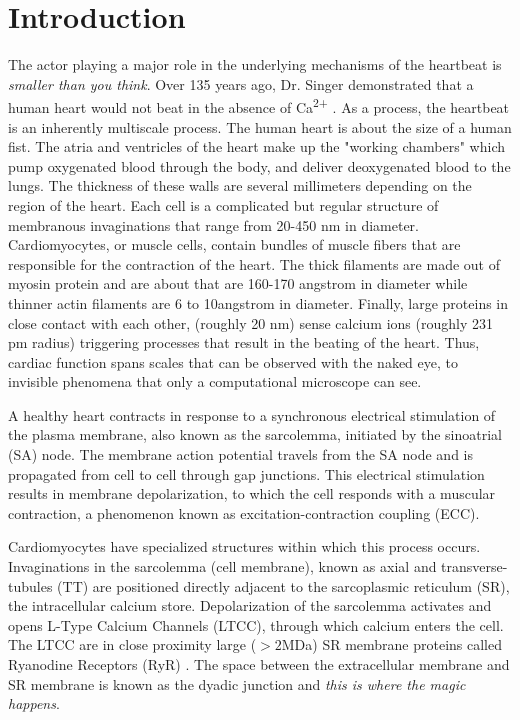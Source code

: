 \documentclass[12pt]{ucsddissertation}
\begin{document}
\section{Introduction}
The actor playing a major role in the underlying mechanisms of the heartbeat is \textit{smaller than you think}. Over 135 years ago, Dr. Singer demonstrated that a human heart would not beat in the absence of Ca\textsuperscript{2+} \cite{Ringer1883}. As a process, the heartbeat is an inherently multiscale process. The human heart is about the size of a human fist. The atria and ventricles of the heart make up the "working chambers" which pump oxygenated blood through the body, and deliver deoxygenated blood to the lungs. The thickness of these walls are several millimeters depending on the region of the heart. Each cell is a complicated but regular structure of membranous invaginations that range from 20-450 nm in diameter. Cardiomyocytes, or muscle cells, contain bundles of muscle fibers that are responsible for the contraction of the heart. The thick filaments are made out of myosin protein and are about that are 160-170 \si{angstrom} in diameter while thinner actin filaments are 6 to 10\si{angstrom} in diameter. Finally, large proteins in close contact with each other, (roughly 20 nm) sense calcium ions (roughly 231 pm radius) triggering processes that result in the beating of the heart. Thus, cardiac function spans scales that can be observed with the naked eye, to invisible phenomena that only a computational microscope can see.  

 A healthy heart contracts in response to a synchronous electrical stimulation of the plasma membrane, also known as the sarcolemma, initiated by the sinoatrial (SA) node. The membrane action potential travels from the SA node and is propagated from cell to cell through gap junctions\cite{Bernstein2006}. This electrical stimulation results in membrane depolarization, to which the cell responds with a muscular contraction, a phenomenon known as  excitation-contraction coupling (ECC)\cite{Cheng1994}. 
 
 Cardiomyocytes have specialized structures within which this process occurs. Invaginations in the sarcolemma (cell membrane), known as axial and transverse-tubules (TT) are positioned directly adjacent to the sarcoplasmic reticulum (SR), the intracellular calcium store. Depolarization of the sarcolemma activates and opens L-Type Calcium Channels (LTCC), through which calcium enters the cell. The LTCC are in close proximity large ($>2$MDa) SR membrane proteins called Ryanodine Receptors (RyR) \cite{Lanner2010}. The space between the extracellular membrane and SR membrane is known as the dyadic junction and \textit{this is where the magic happens}.
\end{document}
